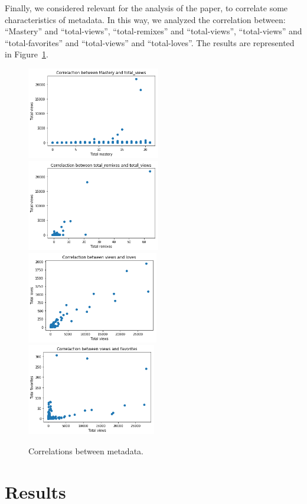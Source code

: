 \documentclass[a4paper,twocolumn,10pt]{article}
\begin{document}
Finally, we considered relevant for the analysis of the paper, to correlate some
characteristics of metadata. In this way, we analyzed the correlation between: 
``Mastery'' and ``total-views'', ``total-remixes'' and ``total-views'',
``total-views'' and ``total-favorites'' and ``total-views'' and ``total-loves''.
The results are represented in Figure~\ref{tab:corr_3}.

\begin{figure}
\begin{center}
\includegraphics[height=4cm]{images/7.png}
\includegraphics[height=4cm]{images/8.png}
\includegraphics[height=4cm]{images/9.png}
\includegraphics[height=4cm]{images/10.png}
\caption{Correlations between metadata.}
\label{tab:corr_3}
\end{center}
\end{figure}


\section{Results}
\label{sec:results}
\end{document}
